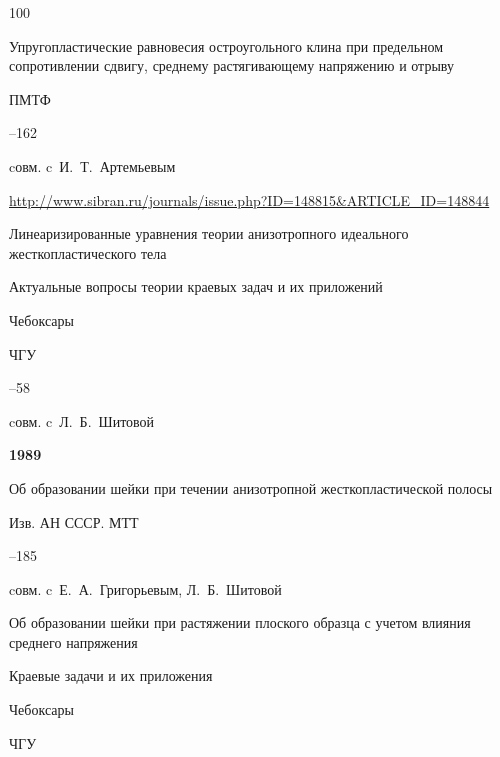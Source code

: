 \begin{thebibliography}{100}







\paper Упругопластические равновесия остроугольного клина при предельном сопротивлении сдвигу, среднему растягивающему напряжению и отрыву 

\jour ПМТФ



–162

\miscnote cовм. c~И.~Т.~Артемьевым

\elink \url{http://www.sibran.ru/journals/issue.php?ID=148815&ARTICLE_ID=148844}




\paper Линеаризированные уравнения теории анизотропного идеального жесткопластического тела 

\inbook Актуальные вопросы теории краевых задач и их приложений

\publaddr Чебоксары

\publ ЧГУ


–58 

\miscnote cовм. c~Л.~Б.~Шитовой



\item[] \centerline{\bf 1989}




\paper Об образовании шейки при течении анизотропной жесткопластической полосы 

\jour Изв. АН СССР. МТТ



–185 

\miscnote cовм. c~Е.~А.~Григорьевым, Л.~Б.~Шитовой




\paper Об образовании шейки при растяжении плоского образца с учетом влияния среднего напряжения 

\inbook Краевые задачи и их приложения

\publaddr Чебоксары

\publ ЧГУ


\end{thebibliography}
